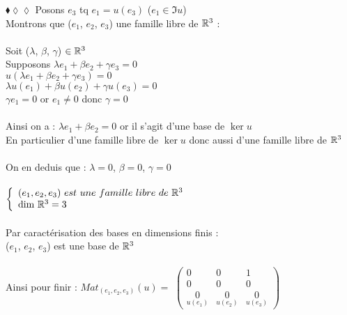 \documentclass[11pt]{article}
\begin{document}
\begin{exercise}{$\blacklozenge\lozenge\lozenge$}{}
    Posons $e_{3}$ tq $e_{1} = u{(e_{3})}$ ($e_{1} \in \Im{u}$)\\
    Montrons que ($e_{1}$, $e_{2}$, $e_{3}$) une famille libre de $\mathbb{R}^{3}$ : \\\\
    Soit ($\lambda$, $\beta$, $\gamma$) $\in \mathbb{R}^{3}$\\
    Supposons $\lambda e_{1} + \beta e_{2} + \gamma e_{3} = 0$\\
    $u{(\lambda e_{1} + \beta e_{2} + \gamma e_{3})} = 0$ \\
    $\lambda u{(e_{1})} + \beta u{(e_{2})} + \gamma u{(e_{3})} = 0$ \\
    $\gamma e_{1} = 0$ or $e_{1} \neq 0$ donc $\gamma = 0$\\\\
    Ainsi on a : $\lambda e_{1} + \beta e_{2} = 0$ or il s'agit d'une base de $\ker{u}$\\
    En particulier d'une famille libre de $\ker{u}$ donc aussi d'une famille libre de $\mathbb{R}^{3}$\\\\
    On en deduis que : $\lambda = 0$, $\beta = 0$, $\gamma = 0$\\\\
    $\left\{
        \begin{array}{ll}
            (e_{1}, e_{2}, e_{3})~est~une~famille~libre~de~\mathbb{R}^{3} \\
            \textrm{dim}~\mathbb{R}^{3} = 3
        \end{array}
    \right.$\\\\
    Par caractérisation des bases en dimensions finis :\\
    ($e_{1}$, $e_{2}$, $e_{3}$) est une base de $\mathbb{R}^{3}$\\\\
    Ainsi pour finir : $Mat_{(e_{1}, e_{2}, e_{3})}(u) = $ 
    $\begin{pmatrix}
            0 & 0 & 1 \\
            0 & 0 & 0 \\
            \underset{u{(e_{1})}}{0} & \underset{u{(e_{2})}}{0} & \underset{u{(e_{3})}}{0}
    \end{pmatrix}$\\
\end{exercise}
\end{document}
